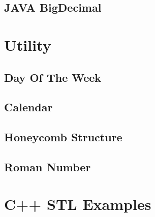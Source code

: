 \documentclass{article}
\begin{document}
    \subsection{JAVA BigDecimal}

\section{Utility}
    \subsection{Day Of The Week}
    \subsection{Calendar}
        
    \subsection{Honeycomb Structure}
        
    \subsection{Roman Number}

\section{C++ STL Examples}
\end{document}
